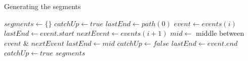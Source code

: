 \begin{algorithm}[h]
\caption{Generating the segments}
\label{alg:segments}
\begin{algorithmic}[1]
\State $segments \leftarrow \{\}$
\State $catchUp \leftarrow true$
\State $lastEnd \leftarrow path(0)$
\State $event \leftarrow events(i)$
	\State {} 
	\State {}
	\State $lastEnd \leftarrow event.start$
\EndIf
\State $nextEvent \leftarrow events(i+1)$
	\State $mid \leftarrow$ middle between $event$ \& $nextEvent$
	\State {}
	\State $lastEnd \leftarrow mid$
	\State $catchUp \leftarrow false$
\Else
	\State {} 
	\State {}
	\State $lastEnd \leftarrow event.end$
	\State $catchUp \leftarrow true$
\EndIf
\EndFor
\State {}
\Return $segments$
\EndFunction
\end{algorithmic}
\end{algorithm}



